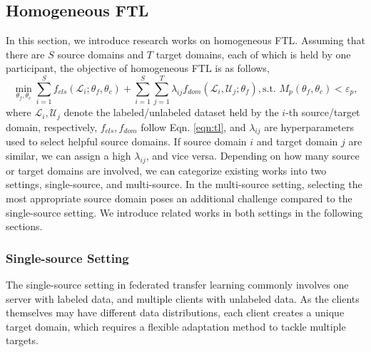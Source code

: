 \documentclass[11pt]{article}
\begin{document}
\subsection{Homogeneous FTL}
In this section, we introduce research works on homogeneous FTL. Assuming that there are $S$ source domains and $T$ target domains, each of which is held by one participant, the objective of homogeneous FTL is as follows,
\begin{equation}
\min_{\theta_f, \theta_c} \sum_{i=1}^Sf_{cls}(\mathcal{L}_i;\theta_f, \theta_c) + \sum_{i=1}^S\sum_{j=1}^T\lambda_{ij}f_{dom}(\mathcal{L}_i, \mathcal{U}_j;\theta_f), \text{s.t. } M_p(\theta_f, \theta_c) < \varepsilon_p,
\end{equation}
where $\mathcal{L}_i, \mathcal{U}_j$ denote the labeled/unlabeled dataset held by the $i$-th source/target domain, respectively, $f_{cls}, f_{dom}$ follow Eqn. \ref{eqn:tl}, and $\lambda_{ij}$ are hyperparameters used to select helpful source domains. If source domain $i$ and target domain $j$ are similar, we can assign a high $\lambda_{ij}$, and vice versa. Depending on how many source or target domains are involved, we can categorize existing works into two settings, single-source, and multi-source. In the multi-source setting, selecting the most appropriate source domain poses an additional challenge compared to the single-source setting. We introduce related works in both settings in the following sections.

\subsubsection{Single-source Setting}
The single-source setting in federated transfer learning commonly involves one server with labeled data, and multiple clients with unlabeled data. As the clients themselves may have different data distributions, each client creates a unique target domain, which requires a flexible adaptation method to tackle multiple targets.
\end{document}
